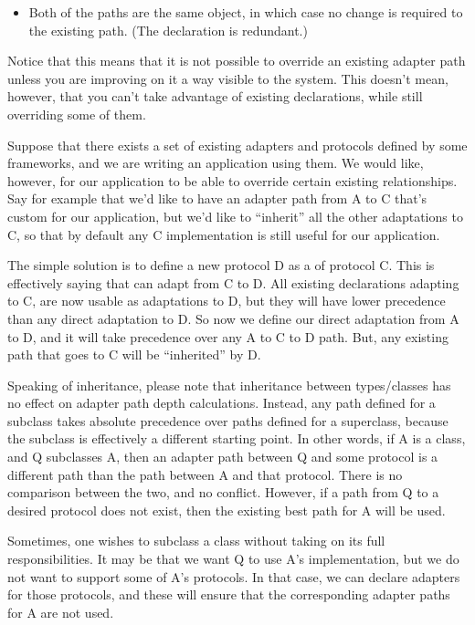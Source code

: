 \begin{verbatim%
}
\begin{verbatim%
}
\begin{verbatim%
}
\begin{verbatim%
}
\begin{verbatim%
}
\begin{verbatim%
}
\begin{itemize}
\item Both of the paths are the same object, in which case no change is
required to the existing path.  (The declaration is redundant.)
\end{itemize}

Notice that this means that it is not possible to override an existing adapter
path unless you are improving on it a way visible to the system.  This doesn't
mean, however, that you can't take advantage of existing declarations, while
still overriding some of them.

Suppose that there exists a set of existing adapters and protocols defined by
some frameworks, and we are writing an application using them.  We would like,
however, for our application to be able to override certain existing
relationships.  Say for example that we'd like to have an adapter path from A
to C that's custom for our application, but we'd like to ``inherit'' all the
other adaptations to C, so that by default any C implementation is still useful
for our application.

The simple solution is to define a new protocol D as a  of
protocol C.  This is effectively saying that  can
adapt from C to D. All existing declarations adapting to C, are now usable as
adaptations to D, but they will have lower precedence than any direct
adaptation to D. So now we define our direct adaptation from A to D, and it
will take precedence over any A to C to D path. But, any existing path that
goes to C will be ``inherited'' by D.

Speaking of inheritance, please note that inheritance between types/classes has
no effect on adapter path depth calculations.  Instead, any path defined for a
subclass takes absolute precedence over paths defined for a superclass, because
the subclass is effectively a different starting point.  In other words, if A
is a class, and Q subclasses A, then an adapter path between Q and some
protocol is a different path than the path between A and that protocol.  There
is no comparison between the two, and no conflict.  However, if a path from Q
to a desired protocol does not exist, then the existing best path for A will be
used.

Sometimes, one wishes to subclass a class without taking on its full
responsibilities.  It may be that we want Q to use A's implementation, but we
do not want to support some of A's protocols. In that case, we can declare
 adapters for those protocols, and these will ensure
that the corresponding adapter paths for A are not used.






\end{verbatim%
}
\end{verbatim%
}
\end{verbatim%
}
\end{verbatim%
}
\end{verbatim%
}
\end{verbatim%
}
